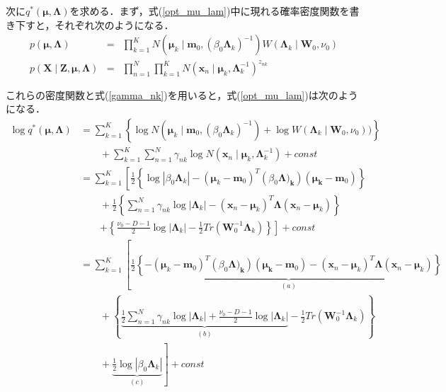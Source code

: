 \documentclass[uplatex]{jsarticle}
\begin{document}
次に$q^*(\bm{\mu}, \bm{\Lambda})$を求める．まず，式(\ref{opt_mu_lam})中に現れる確率密度関数を書き下すと，それぞれ次のようになる．
\begin{eqnarray*}
p(\bm{\mu}, \bm{\Lambda}) &=& \prod_{k=1}^K N (\bm{\mu}_k \mid \bm{m}_0, (\beta_0 \bm{\Lambda}_k)^{-1}) W(\bm{\Lambda}_k \mid \bm{W}_0, \nu_0) \\
p(\bm{X} \mid \bm{Z}, \bm{\mu}, \bm{\Lambda}) &=& \prod_{n=1}^N \prod_{k=1}^K N(\bm{x}_n \mid \bm{\mu}_k, \bm{\Lambda}_k^{-1})^{z_{nk}}
\end{eqnarray*}

これらの密度関数と式(\ref{gamma_nk})を用いると，式(\ref{opt_mu_lam})は次のようになる．
\begin{align}
\log q^* (\bm{\mu}, \bm{\Lambda}) &= \sum_{k=1}^K \left\{ \log N(\bm{\mu}_k \mid \bm{m}_0, (\beta_0 \bm{\Lambda}_k)^{-1}) + \log W(\bm{\Lambda}_k \mid \bm{W}_0, \nu_0))\right\} \nonumber \\
 &\qquad + \sum_{k=1}^K \sum_{n=1}^N \gamma_{nk} \log N(\bm{x}_n \mid \bm{\mu}_k, \bm{\Lambda}_k^{-1}) + const \nonumber \\
&= \sum_{k=1}^K \left[ \frac{1}{2} \left\{ \log |\beta_0 \bm{\Lambda}_k| - (\bm{\mu}_k - \bm{m}_0)^T(\beta_0 \bm{\Lambda)_k})(\bm{\mu_k} - \bm{m}_0) \right\} \right. \nonumber \\
 &\qquad+ \frac{1}{2} \left\{ \sum_{n=1}^N \gamma_{nk} \log |\bm{\Lambda}_k| - (\bm{x}_n - \bm{\mu}_k)^T\bm{\Lambda}(\bm{x}_n - \bm{\mu}_k) \right\} \nonumber \\
 &\qquad \left. + \left\{ \frac{\nu_0 - D - 1}{2} \log |\bm{\Lambda}_k| - \frac{1}{2} Tr(\bm{W}_0^{-1} \bm{\Lambda}_k) \right\} \right] + const \nonumber \\
&= \sum_{k=1}^K \left[ \frac{1}{2} \underbrace{\left\{ - (\bm{\mu}_k - \bm{m}_0)^T(\beta_0 \bm{\Lambda)_k})(\bm{\mu_k} - \bm{m}_0) - (\bm{x}_n - \bm{\mu}_k)^T\bm{\Lambda}(\bm{x}_n - \bm{\mu}_k) \right\}}_{(a)} \right. \nonumber\\
 &\qquad+ \left\{ \underbrace{\frac{1}{2}\sum_{n=1}^N \gamma_{nk} \log |\bm{\Lambda}_k| + \frac{\nu_0 - D - 1}{2} \log |\bm{\Lambda}_k|}_{(b)} - \frac{1}{2} Tr(\bm{W}_0^{-1} \bm{\Lambda}_k) \right\} \nonumber \\
 \label{opt_six}
 &\qquad+ \left. \underbrace{\frac{1}{2} \log |\beta_0\bm{\Lambda}_k|}_{(c)} \right] + const
\end{align}
\end{document}
